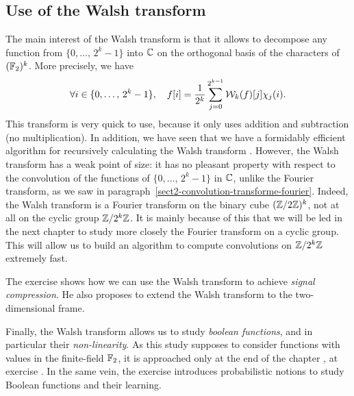 \subsection{Use of the Walsh transform}
\label{sect2-use-fwt} 
 
 
 The main interest of the Walsh transform is that it allows to decompose any function from $ \{0, \ldots, \, 2^k-1\} $ into $ \mathbb{C} $ on the orthogonal basis of the characters of $ (\mathbb{F}_2)^k $. More precisely, we have
\begin{equation*}
\forall i \in \{0, \ldots, \, 2^k-1\}, \quad f [i] = \frac{1}{2^k} \sum_{j = 0}^{2^{k-1}}{\mathcal{W}_k (f) [j] \chi_j (i)}.
\end{equation*}
This transform is very quick to use, because it only uses addition and subtraction (no multiplication). In addition, we have seen that we have a formidably efficient algorithm for recursively calculating the Walsh transform . However, the Walsh transform has a weak point of size: it has no pleasant property with respect to the convolution of the functions of $ \{0, \ldots, \, 2^k-1\} $ in $ \mathbb{C} $, unlike the Fourier transform, as we saw in paragraph~\ref{sect2-convolution-transforme-fourier}. Indeed, the Walsh transform is a Fourier transform on the binary cube $ (\mathbb{Z}/2 \mathbb{Z})^k $, not at all on the cyclic group $ \mathbb{Z}/2^k \mathbb{Z} $. It is mainly because of this that we will be led in the next chapter to study more closely the Fourier transform on a cyclic group. This will allow us to build an algorithm to compute convolutions on $ \mathbb{Z}/2^k \mathbb{Z} $ extremely fast.
 
 
 The exercise  shows how we can use the Walsh transform to achieve \textit{signal compression}. He also proposes to extend the Walsh transform to the two-dimensional frame.
 
 
  Finally, the Walsh transform allows us to study \textit{boolean functions}, and in particular their \textit{non-linearity}. As this study supposes to consider functions with values in the finite-field $ \mathbb{F}_2 $, it is approached only at the end of the chapter , at exercise . In the same vein, the exercise  introduces probabilistic notions to study Boolean functions and their learning.
